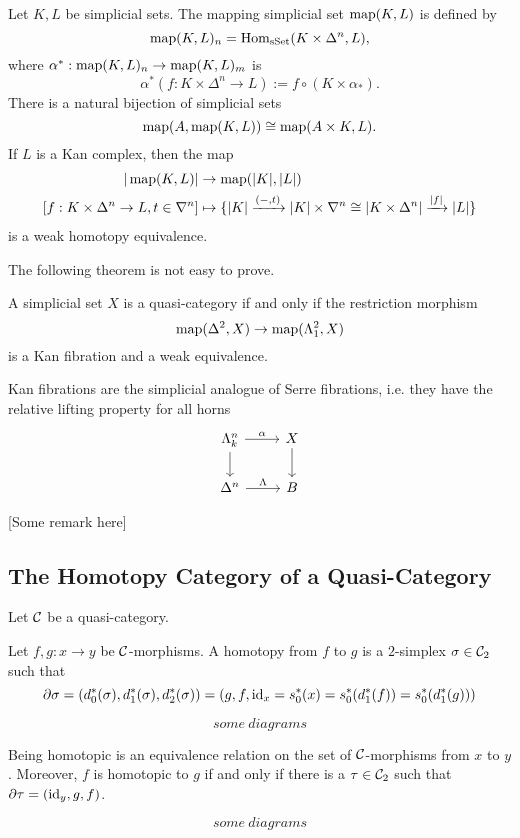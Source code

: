 Let $K,L$ be simplicial sets. The mapping simplicial set $\operatorname{map}(K,L)$ is defined by
\[\operatorname{map}(K,L)_n=\operatorname{Hom}_{\mathrm{sSet}}(K\times\Delta^n,L),\]
where $\alpha^*:\operatorname{map}(K,L)_n\to\operatorname{map}(K,L)_m$ is
\[\alpha^*(f:K\times\Delta^n\to L):=f\circ(K\times\alpha_*).\]
There is a natural bijection of simplicial sets
\[\operatorname{map}(A,\operatorname{map}(K,L))\cong\operatorname{map}(A\times K,L).\]
If $L$ is a Kan complex, then the map
\begin{align*}
    |\map(K,L)|&\to\map(|K|,|L|)\\
    [f:K\times\Delta^n\to L,t\in\sx{n}]&\mapsto\cb{|K|\xto{(-,t)}|K|\times\sx{n}\cong|K\times\Delta^n|\xto{|f|}|L|}
\end{align*}
is a weak homotopy equivalence.

The following theorem is not easy to prove.

\begin{theorem}[Joyal]
A simplicial set $X$ is a quasi-category if and only if the restriction morphism
\[\operatorname{map}(\Delta^2,X)\to\operatorname{map}(\Lambda^2_1,X)\]
is a Kan fibration and a weak equivalence.
\end{theorem}

Kan fibrations are the simplicial analogue of Serre fibrations, i.e. they have the relative lifting property for all horns
\[
\begin{tikzcd}
\Lambda^n_k \ar[d] \ar[r,"\alpha"] & X \ar[d]\\
\Delta^n \ar[r,"\Lambda"] & B
\end{tikzcd}
\]

[Some remark here]

\subsection{The Homotopy Category of a Quasi-Category}

Let $\mathcal{C}$ be a quasi-category.

Let $f,g:x\to y$ be $\mathcal{C}$-morphisms. A homotopy from $f$ to $g$ is a $2$-simplex $\sigma\in\mathcal{C}_2$ such that
\[\partial\sigma=(d_0^*(\sigma),d_1^*(\sigma),d_2^*(\sigma))=(g,f,\operatorname{id}_x=s_0^*(x)=s_0^*(d_1^*(f))=s_0^*(d_1^*(g)))\]

\[
some\ diagrams
\]

\begin{proposition}
Being homotopic is an equivalence relation on the set of $\mathcal{C}$-morphisms from $x$ to $y$. Moreover, $f$ is homotopic to $g$ if and only if there is a $\tau\in\mathcal{C}_2$ such that $\partial\tau=(\operatorname{id}_y,g,f)$.

\[
some\ diagrams
\]

\end{proposition}


